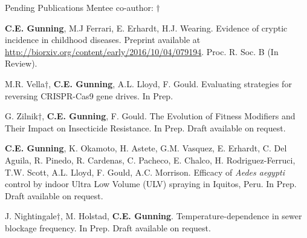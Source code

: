 \documentclass{resume} %
\begin{document}
\begin{rSection}{Pending Publications}
Mentee co-author: $\dagger$

{\bf C.E. Gunning}, M.J Ferrari, E. Erhardt, H.J. Wearing.
Evidence of cryptic incidence in childhood diseases. 
Preprint available at \url{http://biorxiv.org/content/early/2016/10/04/079194}.
Proc. R. Soc. B (In Review).

M.R. Vella$\dagger$, {\bf C.E. Gunning}, A.L. Lloyd, F. Gould.
Evaluating strategies for reversing CRISPR-Cas9 gene drives.
In Prep.

G. Zilnik$\dagger$, {\bf C.E. Gunning}, F. Gould.
The Evolution of Fitness Modifiers and Their Impact on Insecticide Resistance.
In Prep. Draft available on request.

{\bf C.E. Gunning}, K. Okamoto, H. Astete, G.M. Vasquez, E. Erhardt, 
C. Del Aguila, R. Pinedo, R. Cardenas, C. Pacheco, E. Chalco, 
H. Rodriguez-Ferruci, T.W. Scott, A.L. Lloyd, F. Gould, A.C. Morrison.
Efficacy of {\em Aedes aegypti} control by indoor Ultra Low Volume (ULV) spraying 
in Iquitos, Peru. 
In Prep. Draft available on request.

J. Nightingale$\dagger$, M. Holstad, {\bf C.E. Gunning}.
Temperature-dependence in sewer blockage frequency. 
In Prep. Draft available
on request.

\end{rSection}
\end{document}
